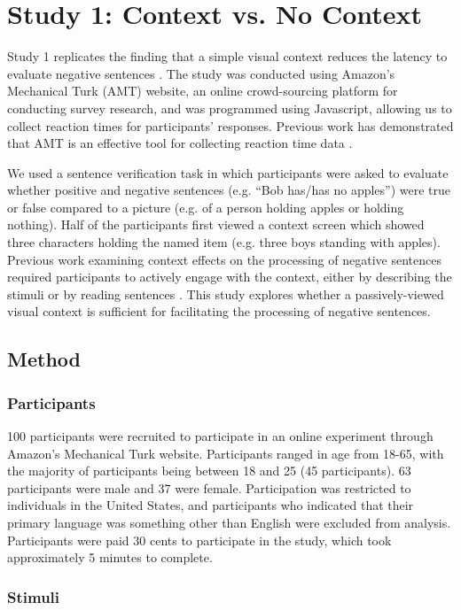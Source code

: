\documentclass[10pt,letterpaper]{article}
\begin{document}
\section{Study 1: Context vs. No Context}
Study 1 replicates the finding that a simple visual context reduces the latency to evaluate negative sentences \cite{wason1965}.  The study was conducted using Amazon's Mechanical Turk (AMT) website, an online crowd-sourcing platform for conducting survey research, and was programmed using Javascript, allowing us to collect reaction times for participants' responses.  Previous work has 
demonstrated that AMT is an effective tool for collecting reaction time data \cite{crump2013}.  

We used a sentence verification task in which participants were asked to evaluate whether positive and negative sentences (e.g. ``Bob has/has no apples'') were true or false compared to a picture (e.g. of a person holding apples or holding nothing).  Half of the participants first viewed a context screen which showed three characters holding the named item (e.g. three boys standing with apples).  Previous work examining context effects on the processing of negative sentences required participants to actively engage with the context, either by describing the stimuli \cite{wason1965} or by reading sentences \cite{glenberg1999, ludtke2006, dale2011}.  This study explores whether a passively-viewed visual context is sufficient for facilitating the processing of negative sentences.  
\subsection{Method}

\subsubsection{Participants}
100 participants were recruited to participate in an online experiment through Amazon's Mechanical Turk website.  Participants ranged in age from 18-65, with the majority of participants being between 18 and 25 (45 participants).  63 participants were male and 37 were female.  Participation was restricted to individuals in the United States, and participants who indicated that their primary language was something other than English were excluded from analysis.  Participants were paid 30 cents to participate in the study, which took approximately 5 minutes to complete.  

\subsubsection{Stimuli}
\end{document}
